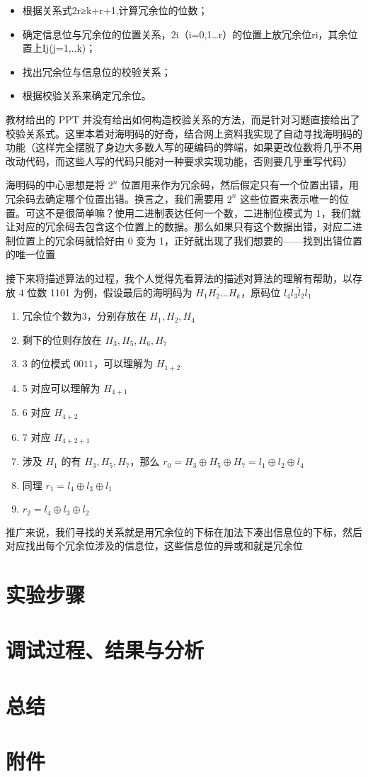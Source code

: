 \documentclass[a4paper,10pt,UTF8]{paper}
\numberwithin{equation}{section}
\numberwithin{figure}{section}
\begin{document}
\begin{itemize}
  \item 根据关系式2r≥k+r+1,计算冗余位的位数；
  \item 确定信息位与冗余位的位置关系，2i（i=0,1…r）的位置上放冗余位ri，其余位置上Ij(j=1,..k)；
  \item 找出冗余位与信息位的校验关系；
  \item 根据校验关系来确定冗余位。
\end{itemize}

教材给出的 PPT 并没有给出如何构造校验关系的方法，而是针对习题直接给出了校验关系式。这里本着对海明码的好奇，结合网上资料我实现了自动寻找海明码的功能（这样完全摆脱了身边大多数人写的硬编码的弊端，如果更改位数将几乎不用改动代码，而这些人写的代码只能对一种要求实现功能，否则要几乎重写代码）

海明码的中心思想是将 $2^n$ 位置用来作为冗余码，然后假定只有一个位置出错，用冗余码去确定哪个位置出错。换言之，我们需要用 $2^n$ 这些位置来表示唯一的位置。可这不是很简单嘛？使用二进制表达任何一个数，二进制位模式为 1，我们就让对应的冗余码去包含这个位置上的数据。那么如果只有这个数据出错，对应二进制位置上的冗余码就恰好由 0 变为 1，正好就出现了我们想要的——找到出错位置的唯一位置

接下来将描述算法的过程，我个人觉得先看算法的描述对算法的理解有帮助，以存放 4 位数 1101 为例，假设最后的海明码为 $\overline{H_1H_2...H_k}$，原码位 $\overline{l_4l_3l_2l_1}$


\begin{enumerate}
  \item 冗余位个数为3，分别存放在 $H_1,H_2,H_4$
  \item 剩下的位则存放在 $H_3,H_5,H_6,H_7$
  \item 3 的位模式 $0011$，可以理解为 $H_{1+2}$
  \item 5 对应可以理解为 $H_{4+1}$
  \item 6 对应 $H_{4+2}$
  \item 7 对应 $H_{4+2+1}$
  \item 涉及 $H_1$ 的有 $H_3,H_5,H_7$，那么 $r_0 = H_3 \oplus H_5 \oplus H_7 = l_1 \oplus l_2 \oplus l_4$
  \item 同理 $r_1 = l_4 \oplus l_3 \oplus l_1$
  \item $r_2 = l_4 \oplus l_3 \oplus l_2$
\end{enumerate}

推广来说，我们寻找的关系就是用冗余位的下标在加法下凑出信息位的下标，然后对应找出每个冗余位涉及的信息位，这些信息位的异或和就是冗余位

\section{实验步骤}

\section{调试过程、结果与分析}

\section{总结}

\section{附件}
\end{document}
